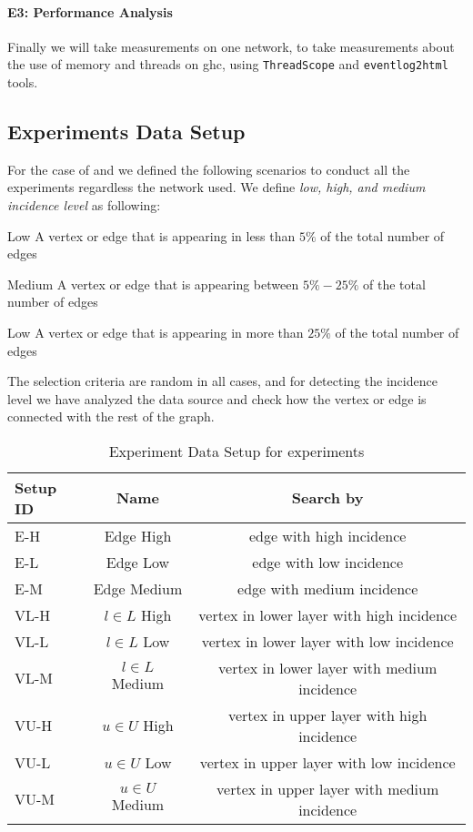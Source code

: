 \paragraph{E3: Performance Analysis}\label{sub:sec:exp-3} Finally we will take measurements on one network, to take measurements about the use of memory and threads on \acrshort{ghc}, using
\texttt{ThreadScope} \cite{threadscope} and \texttt{eventlog2html} \cite{eventlog2html} tools. 

\subsection{Experiments Data Setup}\label{sub:exp:exp-data-setup}
For the case of  and  we defined the following scenarios to conduct all the experiments regardless the network used.
We define \emph{low, high, and medium incidence level} as following:
\begin{inparaenum}
  \item[Low] A vertex or edge that is appearing in less than $5\%$ of the total number of edges
  \item[Medium] A vertex or edge that is appearing between $5\%-25\%$ of the total number of edges
  \item[Low] A vertex or edge that is appearing in more than $25\%$ of the total number of edges
\end{inparaenum}
The selection criteria are random in all cases, and for detecting the incidence level we have analyzed the data source and check how the vertex or edge is connected with the rest of the graph.

\begin{table}[H]
  \centering
  \begin{tabular}{|l|c|c|}
    \hline
   \textbf{Setup ID} & \textbf{Name} & \textbf{Search by}\\
   \hline
   E-H & Edge High & edge with high incidence \\
   \hline
   E-L & Edge Low & edge with low incidence \\
   \hline
   E-M & Edge Medium & edge with medium incidence \\
   \hline
   VL-H & $l \in L$ High & vertex in lower layer with high incidence \\
   \hline
   VL-L & $l \in L$ Low & vertex in lower layer with low incidence \\
   \hline
   VL-M & $l \in L$ Medium & vertex in lower layer with medium incidence \\
   \hline
   VU-H & $u \in U$ High & vertex in upper layer with high incidence \\
   \hline
   VU-L & $u \in U$ Low & vertex in upper layer with low incidence \\
   \hline
   VU-M & $u \in U$ Medium & vertex in upper layer with medium incidence \\
   \hline
  \end{tabular}
 \caption{Experiment Data Setup for experiments}
 \label{table:exp:data-setup}
 \end{table}

